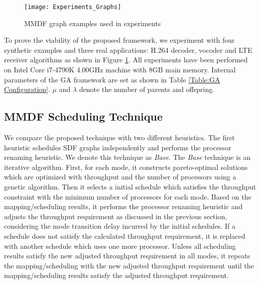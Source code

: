 \documentclass[prodmode,acmtecs]{acmsmall}
\begin{document}
\begin{figure} [ht]
\centerline{\texttt{[image: Experiments\_Graphs]}}
\caption{MMDF graph examples used in experiments}
\label{Figure:Experiments Graphs}
\end{figure}

To prove the viability of the proposed framework, we experiment with four synthetic examples and three real applications: H.264 decoder, vocoder \cite{Zhai:2015} and LTE receiver \cite{Siyoum:2011} algorithms as shown in Figure \ref{Figure:Experiments Graphs}. All experiments have been performed on Intel Core i7-4790K 4.00GHz machine with 8GB main memory. Internal parameters of the GA framework are set as shown in Table \ref{Table:GA Configuration}. $\mu$ and $\lambda$ denote the number of parents and offspring.

\begin{table}[ht]
\centering
{}
\end{table}

\subsection{MMDF Scheduling Technique}
\label{SubSection:MMDF Scheduling Technique}

We compare the proposed technique with two different heuristics. The first heuristic schedules SDF graphs independently and performs the processor renaming heuristic. We denote this technique as \textit{Base}. The \textit{Base} technique is an iterative algorithm. First, for each mode, it constructs pareto-optimal solutions which are optimized with throughput and the number of processors using a genetic algorithm. Then it selects a initial schedule which satisfies the throughput constraint with the minimum number of processors for each mode. Based on the mapping/scheduling results, it performs the processor renaming heuristic and adjusts the throughput requirement as discussed in the previous section, considering the mode transition delay incurred by the initial schedules. If a schedule does not satisfy the calculated throughput requirement, it is replaced with another schedule which uses one more processor. Unless all scheduling results satisfy the new adjusted throughput requirement in all modes, it repeats the mapping/scheduling with the new adjusted throughput requirement until the mapping/scheduling results satisfy the adjusted throughput requirement.
\end{document}
